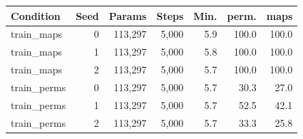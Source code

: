 \begin{tabular}{@{}lrrrrrr@{}}
\toprule
Condition & Seed & Params & Steps & Min. & perm. & maps \\
\midrule
train\_maps & 0 & 113{,}297 & 5{,}000 & 5.9 & 100.0 & 100.0 \\
train\_maps & 1 & 113{,}297 & 5{,}000 & 5.8 & 100.0 & 100.0 \\
train\_maps & 2 & 113{,}297 & 5{,}000 & 5.7 & 100.0 & 100.0 \\
train\_perms & 0 & 113{,}297 & 5{,}000 & 5.7 & 30.3 & 27.0 \\
train\_perms & 1 & 113{,}297 & 5{,}000 & 5.7 & 52.5 & 42.1 \\
train\_perms & 2 & 113{,}297 & 5{,}000 & 5.7 & 33.3 & 25.8 \\
\bottomrule
\end{tabular}
